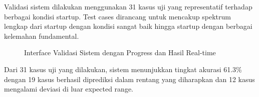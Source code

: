 \documentclass[12pt,a4paper]{article}
\begin{document}
Validasi sistem dilakukan menggunakan 31 kasus uji yang representatif terhadap berbagai kondisi startup. Test cases dirancang untuk mencakup spektrum lengkap dari startup dengan kondisi sangat baik hingga startup dengan berbagai kelemahan fundamental.

\begin{figure}[htbp] %
    \centering
    \caption{Interface Validasi Sistem dengan Progress dan Hasil Real-time}
    \label{fig:validation-ui}
\end{figure}

Dari 31 kasus uji yang dilakukan, sistem menunjukkan tingkat akurasi 61.3\% dengan 19 kasus berhasil diprediksi dalam rentang yang diharapkan dan 12 kasus mengalami deviasi di luar expected range.
\end{document}
